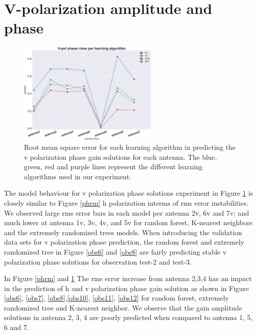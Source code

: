\section{V-polarization amplitude and phase}
\label{Vp}
\begin{figure}[H]
  \centering
    \includegraphics[width=0.6\textwidth]{images/Vpol-phase.eps}
    \caption{Root mean square error for each learning algorithm in predicting the v polarization phase gain solutions for each antenna. The blue, green, red and purple lines represent the different learning algorithms used in our experiment.}
  \label{phrmv}
 \end{figure}
 
The model behaviour for v polarization phase solutions experiment in Figure \ref{phrmv} is closely similar to Figure \ref{phrm} h polarization interms of rms error instabilities. We observed large rms error bars in each model per antenna 2v, 6v and 7v; and much lower at antenna 1v, 3v, 4v, and 5v for random forest, K-nearest neighbors and the extremely randomized trees models. When introducing the validation data sets for v polarization phase prediction, the random forest and extremely randomized tree in Figure \ref{obs6} and \ref{obs8} are fairly predicting stable v polarization phase solutions for observation test-2 and test-3.

In Figure \ref{phrm} and \ref{phrmv} The rms error increase from antenna 2,3,4 has an impact in the prediction of h and v polarization phase gain solution as shown in Figure \ref{obs6}, \ref{obs7}, \ref{obs8},\ref{obs10}, \ref{obs11}, \ref{obs12} for random forest, extremely randomized tree and K-nearest neighbor. We observe that the gain amplitude solutions in antenna 2, 3, 4 are poorly predicted when compared to antenna 1, 5, 6 and 7. 

